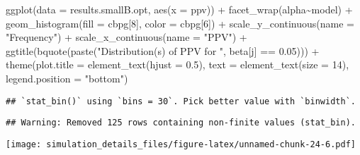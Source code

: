 \documentclass[
]{article}
\newenvironment{Shaded}{\begin{snugshade}}{\end{snugshade}}
\newcommand{\AttributeTok}[1]{\textcolor[rgb]{0.77,0.63,0.00}{#1}}
\newcommand{\DecValTok}[1]{\textcolor[rgb]{0.00,0.00,0.81}{#1}}
\newcommand{\FloatTok}[1]{\textcolor[rgb]{0.00,0.00,0.81}{#1}}
\newcommand{\FunctionTok}[1]{\textcolor[rgb]{0.00,0.00,0.00}{#1}}
\newcommand{\NormalTok}[1]{#1}
\newcommand{\SpecialCharTok}[1]{\textcolor[rgb]{0.00,0.00,0.00}{#1}}
\newcommand{\StringTok}[1]{\textcolor[rgb]{0.31,0.60,0.02}{#1}}
\begin{document}
\begin{Shaded}
\begin{Highlighting}[]
\FunctionTok{ggplot}\NormalTok{(}\AttributeTok{data =}\NormalTok{ results.smallB.opt,}
       \FunctionTok{aes}\NormalTok{(}\AttributeTok{x =}\NormalTok{ ppv)) }\SpecialCharTok{+}
  \FunctionTok{facet\_wrap}\NormalTok{(alpha}\SpecialCharTok{\textasciitilde{}}\NormalTok{model) }\SpecialCharTok{+}
  \FunctionTok{geom\_histogram}\NormalTok{(}\AttributeTok{fill =}\NormalTok{ cbpg[}\DecValTok{8}\NormalTok{], }\AttributeTok{color =}\NormalTok{ cbpg[}\DecValTok{6}\NormalTok{]) }\SpecialCharTok{+}
  \FunctionTok{scale\_y\_continuous}\NormalTok{(}\AttributeTok{name =} \StringTok{"Frequency"}\NormalTok{) }\SpecialCharTok{+}
  \FunctionTok{scale\_x\_continuous}\NormalTok{(}\AttributeTok{name =} \StringTok{"PPV"}\NormalTok{) }\SpecialCharTok{+}
  \FunctionTok{ggtitle}\NormalTok{(}\FunctionTok{bquote}\NormalTok{(}\FunctionTok{paste}\NormalTok{(}\StringTok{"Distribution(s) of PPV for "}\NormalTok{, beta[j] }\SpecialCharTok{==} \FloatTok{0.05}\NormalTok{))) }\SpecialCharTok{+}
  \FunctionTok{theme}\NormalTok{(}\AttributeTok{plot.title =} \FunctionTok{element\_text}\NormalTok{(}\AttributeTok{hjust =} \FloatTok{0.5}\NormalTok{), }
        \AttributeTok{text =} \FunctionTok{element\_text}\NormalTok{(}\AttributeTok{size =} \DecValTok{14}\NormalTok{),}
        \AttributeTok{legend.position =} \StringTok{"bottom"}\NormalTok{)}
\end{Highlighting}
\end{Shaded}

\begin{verbatim}
## `stat_bin()` using `bins = 30`. Pick better value with `binwidth`.
\end{verbatim}

\begin{verbatim}
## Warning: Removed 125 rows containing non-finite values (stat_bin).
\end{verbatim}

\texttt{[image: simulation\_details\_files/figure-latex/unnamed-chunk-24-6.pdf]}
\end{document}
